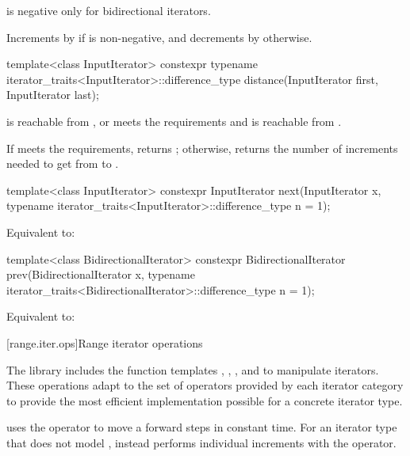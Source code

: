 \begin{itemdescr}
\pnum
\expects
{}
is negative only for bidirectional iterators.

\pnum
\effects
Increments  by  if  is non-negative, and
decrements  by  otherwise.
\end{itemdescr}

%
\begin{itemdecl}
template<class InputIterator>
  constexpr typename iterator_traits<InputIterator>::difference_type
    distance(InputIterator first, InputIterator last);
\end{itemdecl}

\begin{itemdescr}
\pnum
\expects
{} is reachable from , or
 meets
the  requirements and
 is reachable from .

\pnum
\effects
If  meets the  requirements,
returns ; otherwise, returns
the number of increments needed to get from
to
.
\end{itemdescr}

%
\begin{itemdecl}
template<class InputIterator>
  constexpr InputIterator next(InputIterator x,
    typename iterator_traits<InputIterator>::difference_type n = 1);
\end{itemdecl}

\begin{itemdescr}
\pnum
\effects
Equivalent to: 
\end{itemdescr}

%
\begin{itemdecl}
template<class BidirectionalIterator>
  constexpr BidirectionalIterator prev(BidirectionalIterator x,
    typename iterator_traits<BidirectionalIterator>::difference_type n = 1);
\end{itemdecl}

\begin{itemdescr}
\pnum
\effects
Equivalent to: 
\end{itemdescr}

[range.iter.ops]{Range iterator operations}

\pnum
The library includes the function templates
, ,
, and 
to manipulate iterators. These operations adapt to the set of operators
provided by each iterator category to provide the most efficient implementation
possible for a concrete iterator type.
\begin{example}
 uses the \tcode{+} operator to move a
 forward  steps in constant time.
For an iterator type that does not model ,
 instead performs  individual increments with
the \tcode{++} operator.
\end{example}

